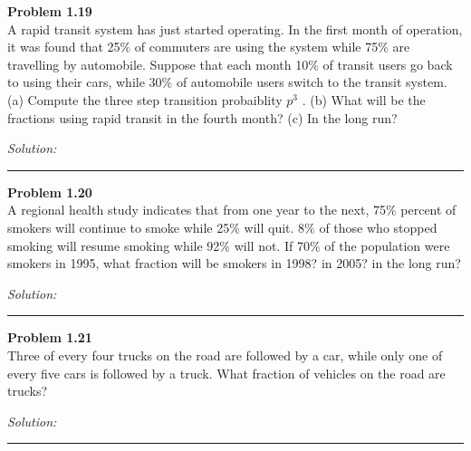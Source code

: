 \documentclass[a4paper, 11pt]{article}
\newenvironment{problem}[2][Problem]
    { \begin{mdframed}[backgroundcolor=gray!20] \textbf{#1 #2} \\}
    {  \end{mdframed}}
\newenvironment{solution}
    {\textit{Solution:}}
    {}
\begin{document}
\begin{problem}{1.19}
A rapid transit system has just started operating. In the first month of
operation, it was found that 25$\%$  of commuters are using the system while 75$\%$ 
are travelling by automobile. Suppose that each month 10$\%$  of transit users go
back to using their cars, while 30$\%$  of automobile users switch to the transit
system. (a) Compute the three step transition probaiblity $p^3$ . (b) What will be the fractions using rapid transit in the fourth month? (c) In the long run?

\end{problem}
\begin{solution}

\end{solution} 

\noindent\rule{7in}{2.8pt}

\begin{problem}{1.20}
A regional health study indicates that from one year to the next, 75$\%$ percent of smokers will continue to smoke while 25$\%$ will quit. 8$\%$ of those who stopped smoking will resume smoking while 92$\%$ will not. If 70$\%$ of the population were smokers in 1995, what fraction will be smokers in 1998? in 2005? in the long run?

\end{problem}
\begin{solution}

\end{solution} 

\noindent\rule{7in}{2.8pt}

\begin{problem}{1.21}
Three of every four trucks on the road are followed by a car, while only one of every five cars is followed by a truck. What fraction of vehicles on the road are trucks?

\end{problem}
\begin{solution}

\end{solution} 

\noindent\rule{7in}{2.8pt}

\end{document}

